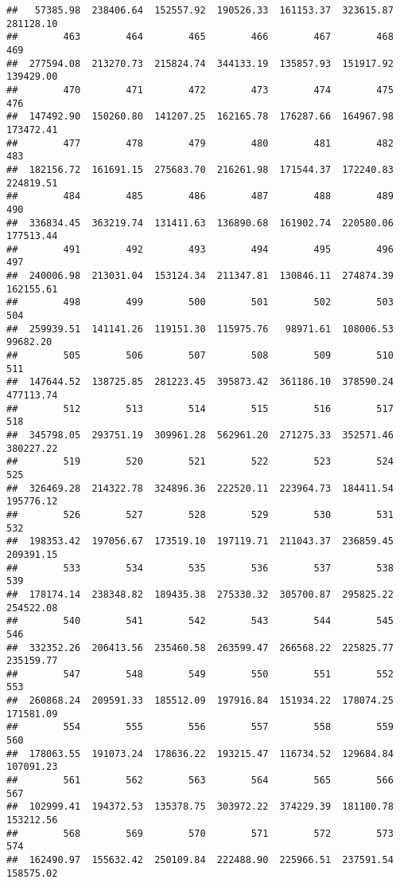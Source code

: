 \documentclass[
]{article}
\begin{document}
\begin{verbatim}
##   57385.98  238406.64  152557.92  190526.33  161153.37  323615.87  281128.10 
##        463        464        465        466        467        468        469 
##  277594.08  213270.73  215824.74  344133.19  135857.93  151917.92  139429.00 
##        470        471        472        473        474        475        476 
##  147492.90  150260.80  141207.25  162165.78  176287.66  164967.98  173472.41 
##        477        478        479        480        481        482        483 
##  182156.72  161691.15  275683.70  216261.98  171544.37  172240.83  224819.51 
##        484        485        486        487        488        489        490 
##  336834.45  363219.74  131411.63  136890.68  161902.74  220580.06  177513.44 
##        491        492        493        494        495        496        497 
##  240006.98  213031.04  153124.34  211347.81  130846.11  274874.39  162155.61 
##        498        499        500        501        502        503        504 
##  259939.51  141141.26  119151.30  115975.76   98971.61  108006.53   99682.20 
##        505        506        507        508        509        510        511 
##  147644.52  138725.85  281223.45  395873.42  361186.10  378590.24  477113.74 
##        512        513        514        515        516        517        518 
##  345798.05  293751.19  309961.28  562961.20  271275.33  352571.46  380227.22 
##        519        520        521        522        523        524        525 
##  326469.28  214322.78  324896.36  222520.11  223964.73  184411.54  195776.12 
##        526        527        528        529        530        531        532 
##  198353.42  197056.67  173519.10  197119.71  211043.37  236859.45  209391.15 
##        533        534        535        536        537        538        539 
##  178174.14  238348.82  189435.38  275330.32  305700.87  295825.22  254522.08 
##        540        541        542        543        544        545        546 
##  332352.26  206413.56  235460.58  263599.47  266568.22  225825.77  235159.77 
##        547        548        549        550        551        552        553 
##  260868.24  209591.33  185512.09  197916.84  151934.22  178074.25  171581.09 
##        554        555        556        557        558        559        560 
##  178063.55  191073.24  178636.22  193215.47  116734.52  129684.84  107091.23 
##        561        562        563        564        565        566        567 
##  102999.41  194372.53  135378.75  303972.22  374229.39  181100.78  153212.56 
##        568        569        570        571        572        573        574 
##  162490.97  155632.42  250109.84  222488.90  225966.51  237591.54  158575.02 

\end{verbatim}
\end{document}
